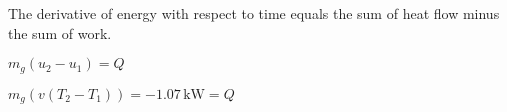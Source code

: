 The derivative of energy with respect to time equals the sum of heat flow minus the sum of work.  

\( m_g (u_2 - u_1) = Q \)  

\( m_g (v (T_2 - T_1)) = -1.07 \, \text{kW} = Q \)